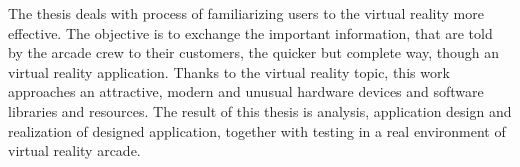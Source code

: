 The thesis deals with process of familiarizing users to the virtual
reality more effective. The objective is to exchange the important
information, that are told by the arcade crew to their customers, the
quicker but complete way, though an virtual reality application. Thanks
to the virtual reality topic, this work approaches an attractive, modern
and unusual hardware devices and software libraries and resources. The
result of this thesis is analysis, application design and realization of
designed application, together with testing in a real environment of
virtual reality arcade.
